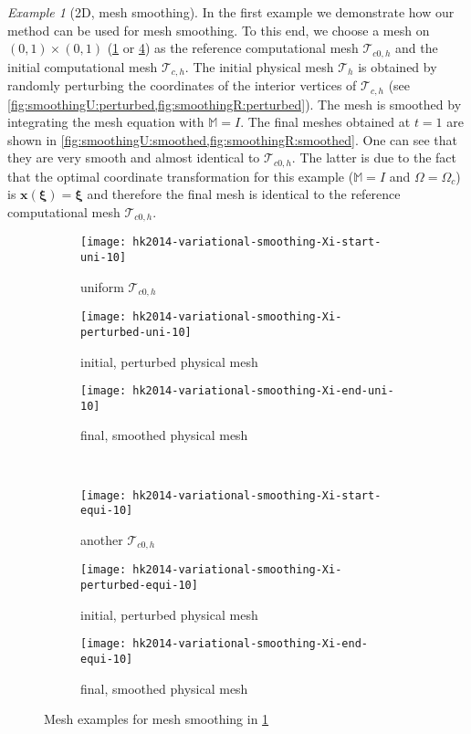 \documentclass[american]{scrartcl}
\providecommand{\V}[1]{\boldsymbol{#1}}
\providecommand{\Th}{\mathcal{T}_h}
\providecommand{\Thc}{\mathcal{T}_{c,h}}
\providecommand{\ThcO}{\mathcal{T}_{c0, h}}
\providecommand{\M}{\mathbb{M}}
\theoremstyle{remark}
\newtheorem{example}{\hspace{1ex}Example}[section]
\begin{document}
\begin{example}[2D, mesh smoothing]
\label{ex:smoothing}
In the first example we demonstrate how our method can be used for mesh smoothing.
To this end, we choose a mesh on $(0,1) \times (0,1)$ (\cref{fig:smoothingU:regular} or \cref{fig:smoothingR:regular}) as the reference computational mesh $\ThcO$ and the initial computational mesh $\Thc$.
The initial physical mesh $\Th$ is obtained by randomly perturbing the coordinates of the interior vertices of $\Thc$ (see \cref{fig:smoothingU:perturbed,fig:smoothingR:perturbed}).
The mesh is smoothed by integrating the mesh equation with $\M = I$.
The final meshes obtained at $t=1$ are shown in \cref{fig:smoothingU:smoothed,fig:smoothingR:smoothed}.
One can see that they are very smooth and almost identical to $\ThcO$.
The latter is due to the fact that the optimal coordinate transformation for this example ($\M=I$ and $\Omega = \Omega_c$) is $\V{x}(\V{\xi}) = \V{\xi}$ and therefore the final mesh is identical to the reference computational mesh $\ThcO$.

\begin{figure}[p]
   \begin{subfigure}[t]{0.31\linewidth}
      \texttt{[image: hk2014-variational-smoothing-Xi-start-uni-10]}      \caption{uniform $\ThcO$}\label{fig:smoothingU:regular}
   \end{subfigure}   \hfill   \begin{subfigure}[t]{0.31\linewidth}
      \texttt{[image: hk2014-variational-smoothing-Xi-perturbed-uni-10]}      \caption{initial, perturbed physical mesh}\label{fig:smoothingU:perturbed}
   \end{subfigure}
   \hfill   \begin{subfigure}[t]{0.31\linewidth}
      \texttt{[image: hk2014-variational-smoothing-Xi-end-uni-10]}      \caption{final, smoothed physical mesh}\label{fig:smoothingU:smoothed}
   \end{subfigure}   \\[1ex]
   \begin{subfigure}[t]{0.31\linewidth}
      \texttt{[image: hk2014-variational-smoothing-Xi-start-equi-10]}      \caption{another $\ThcO$}\label{fig:smoothingR:regular}
   \end{subfigure}   \hfill   \begin{subfigure}[t]{0.31\linewidth}
      \texttt{[image: hk2014-variational-smoothing-Xi-perturbed-equi-10]}      \caption{initial, perturbed physical mesh}\label{fig:smoothingR:perturbed}
   \end{subfigure}   \hfill   \begin{subfigure}[t]{0.31\linewidth}
      \texttt{[image: hk2014-variational-smoothing-Xi-end-equi-10]}      \caption{final, smoothed physical mesh}\label{fig:smoothingR:smoothed}
   \end{subfigure}
   \caption{Mesh examples for mesh smoothing in \cref{ex:smoothing}\label{fig:smoothing}}
\end{figure}
\end{example}
\end{document}
